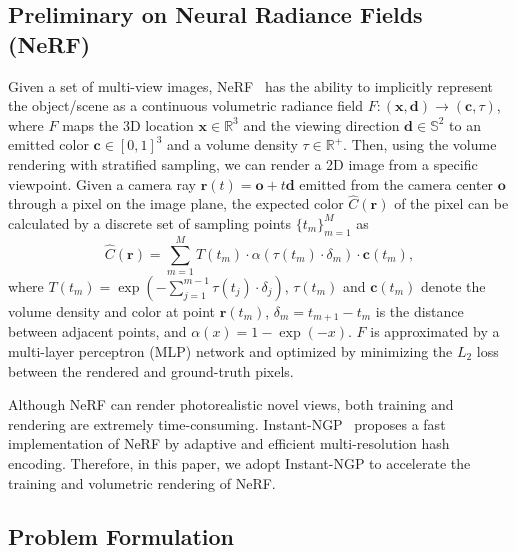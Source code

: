 \documentclass[10pt,journal,compsoc]{IEEEtran}
\begin{document}
\subsection{Preliminary on Neural Radiance Fields (NeRF)}
\label{sec:nerf}

Given a set of multi-view images, NeRF~\cite{mildenhall2020nerf} has the ability to implicitly represent the object/scene as a continuous volumetric radiance field $F:(\mathbf{x},\mathbf{d})\rightarrow (\mathbf{c}, \tau)$, 
where $F$ maps the 3D location $ \mathbf{x}\in \mathbb{R} ^3 $ and the viewing direction $ \mathbf{d}\in \mathbb{S} ^2 $ to an emitted color $ \mathbf{c}\in [0,1]^3 $ and a volume density $\tau\in\mathbb{R}^+ $. Then, using the volume rendering with stratified sampling, we can render a 2D image from a specific viewpoint. Given a camera ray $\mathbf{r}(t) = \mathbf{o} + t\mathbf{d} $ emitted from the camera center $\mathbf{o}$ through a pixel on the image plane, the expected color $\hat{C}(\mathbf{r})$ of the pixel can be calculated by a discrete set of sampling points $\{t_m\}_{m=1}^{M}$ as
\begin{equation} \hat{C}(\mathbf{r})  = \sum_{m=1}^M T(t_m)\cdot \alpha (\tau(t_m) \cdot \delta_m) \cdot \mathbf{c}(t_m),
    \label{eq:nerf_2}
\end{equation}
where $T(t_m)  = \exp(-\sum_{j=1}^{m-1}\tau(t_j)\cdot\delta_j)$,  $\tau(t_m)$ and $\mathbf{c}(t_m)$ denote the volume density and color at point $ \mathbf{r}(t_m)$, $\delta_m = t_{m+1}-t_m$ is the distance between adjacent points, and $ \alpha{(x)}=1-\exp{(-x)} $. $F$ is approximated by a multi-layer perceptron (MLP) network and optimized by minimizing the $L_2$ loss between the rendered and ground-truth pixels.

Although NeRF can render photorealistic novel views, both training and rendering are extremely time-consuming. Instant-NGP~\cite{mueller2022instant} proposes a fast implementation of NeRF by adaptive and efficient multi-resolution hash encoding. Therefore, in this paper, we adopt Instant-NGP to accelerate the training and volumetric rendering of NeRF.

\subsection{Problem Formulation}
\label{sec:Formulation}
\end{document}
